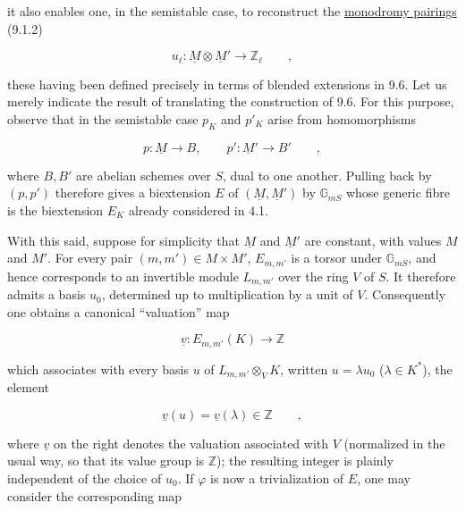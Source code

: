 \noindent
it also enables one, in the semistable case, to reconstruct the
\underline{monodromy pairings} (9.1.2)

\begin{equation}\tag{14.2.4}
 u_\ell:\underline M\otimes\underline M'
 \longrightarrow\mathbb Z_\ell\qquad ,
\end{equation}

\noindent
these having been defined precisely in terms of blended extensions in
9.6.  Let us merely indicate the result of translating the construction
of 9.6.  For this purpose, observe that in the semistable case $p_K$
and $p'_K$ arise from homomorphisms

\begin{equation*}
 p:\underline M\longrightarrow B,\qquad
 p':\underline M'\longrightarrow B'\qquad ,
\end{equation*}

\noindent
where $B,B'$ are abelian schemes over $S$, dual to one another.  Pulling
back by $(p,p')$ therefore gives a biextension $E$ of
$(\underline M,\underline M')$ by $\mathbb G_{mS}$ whose generic fibre
is the biextension $E_K$ already considered in 4.1.

With this said, suppose for simplicity that $\underline M$ and
$\underline M'$ are constant, with values $M$ and $M'$.  For every
pair $(m,m')\in M\times M'$, $E_{m,m'}$ is a torsor under
$\mathbb G_{mS}$, and hence corresponds to an invertible module
$L_{m,m'}$ over the ring $V$ of $S$.  It therefore admits a basis
$u_0$, determined up to multiplication by a unit of $V$.  Consequently
one obtains a canonical ``valuation'' map

\begin{equation*}
 \underline v:E_{m,m'}(K)\longrightarrow\mathbb Z
\end{equation*}

\noindent
which associates with every basis $u$ of
$L_{m,m'}\otimes_V K$, written $u=\lambda u_0$ ($\lambda\in K^*$),
the element

\begin{equation*}
 \underline v(u)=\underline v(\lambda)\in\mathbb Z\qquad ,
\end{equation*}

\noindent
where $\underline v$ on the right denotes the valuation associated
with $V$ (normalized in the usual way, so that its value group is
$\mathbb Z$); the resulting integer is plainly independent of the
choice of $u_0$.  If $\varphi$ is now a trivialization of $E$, one may
consider the corresponding map

